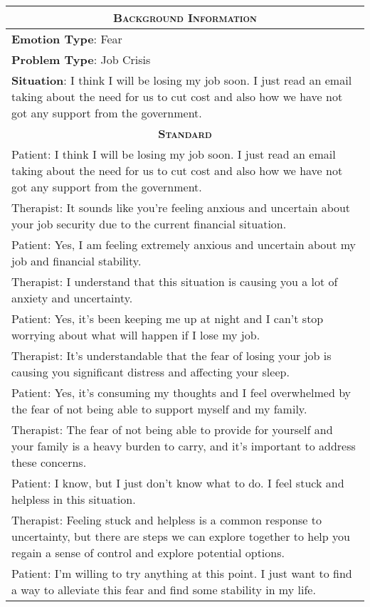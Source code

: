 \begin{table}[]
    \centering
    \begin{tabular}{p{13.5cm}}
    \toprule
    \multicolumn{1}{c}{\textsc{\textbf{Background Information}}}\\
    \midrule
    \textbf{Emotion Type}: Fear \\
    \textbf{Problem Type}: Job Crisis\\
    \textbf{Situation}: I think I will be losing my job soon. I just read an email taking about the need for us to cut cost and also how we have not got any support from the government. \\
    \midrule
    \midrule
    \multicolumn{1}{c}{\textsc{\textbf{Standard}}}\\
    \midrule
    Patient: I think I will be losing my job soon. I just read an email taking about the need for us to cut cost and also how we have not got any support from the government.\\
    Therapist: It sounds like you're feeling anxious and uncertain about your job security due to the current financial situation.\\
    Patient: Yes, I am feeling extremely anxious and uncertain about my job and financial stability.\\
    Therapist: I understand that this situation is causing you a lot of anxiety and uncertainty.\\
    Patient: Yes, it's been keeping me up at night and I can't stop worrying about what will happen if I lose my job.\\
    Therapist: It's understandable that the fear of losing your job is causing you significant distress and affecting your sleep.\\
    Patient: Yes, it's consuming my thoughts and I feel overwhelmed by the fear of not being able to support myself and my family.\\
    Therapist: The fear of not being able to provide for yourself and your family is a heavy burden to carry, and it's important to address these concerns.\\
    Patient: I know, but I just don't know what to do. I feel stuck and helpless in this situation.\\
    Therapist: Feeling stuck and helpless is a common response to uncertainty, but there are steps we can explore together to help you regain a sense of control and explore potential options.\\
    Patient: I'm willing to try anything at this point. I just want to find a way to alleviate this fear and find some stability in my life.\\

\end{tabular}
\end{table}
